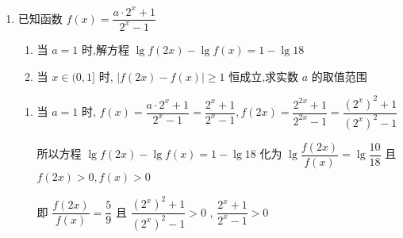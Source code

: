 \begin{enumerate}
\begin{jieda}
        $g\left( x\right)  = \dfrac{{x}^{2} + 4}{x} = x + \dfrac{4}{x}$，所以 $A = \lbrack 4, + \infty )$
        
         $h\left( x\right)  = {2}^{\left| x - a\right| }$在$(-\infty, a)$严格减，在$(a, +\infty)$严格增，结合图像可知
        综合得 $0 \leq  a < 4$ 
    \end{jieda}
    \item 已知函数 $f\left( x\right)  = \dfrac{a \cdot  {2}^{x} + 1}{{2}^{x} - 1}$ 
    \begin{enumerate}
        \item 当 $a = 1$ 时,解方程 $\lg f\left( {2x}\right)  - \lg f\left( x\right)  = 1 - \lg {18}$
        \item 当 $x \in  (0,1\rbrack$ 时, $\left| {f\left( {2x}\right)  - f\left( x\right) }\right|  \geq  1$ 恒成立,求实数 $a$ 的取值范围
    \end{enumerate}
    \begin{jieda}
        \begin{enumerate}
            \item 当 $a = 1$ 时, $f\left( x\right)  = \dfrac{a \cdot  {2}^{x} + 1}{{2}^{x} - 1} = \dfrac{{2}^{x} + 1}{{2}^{x} - 1},f\left( {2x}\right)  = \dfrac{{2}^{2x} + 1}{{2}^{2x} - 1} = \dfrac{{\left( {2}^{x}\right) }^{2} + 1}{{\left( {2}^{x}\right) }^{2} - 1}$ 
            
            所以方程 $\lg f\left( {2x}\right)  - \lg f\left( x\right)  = 1 - \lg {18}$ 化为 $\lg \dfrac{f\left( {2x}\right) }{f\left( x\right) } = \lg \dfrac{10}{18}$ 且 $f\left( {2x}\right)  > 0,f\left( x\right)  > 0$
            
            即 $\dfrac{f\left( {2x}\right) }{f\left( x\right) } = \dfrac{5}{9}$ 且 $\dfrac{{\left( {2}^{x}\right) }^{2} + 1}{{\left( {2}^{x}\right) }^{2} - 1} > 0$ ,
            $\dfrac{{2}^{x} + 1}{{2}^{x} - 1} > 0$
            

\end{enumerate}
\end{jieda}
\end{enumerate}
